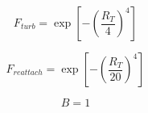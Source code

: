 \documentclass{article}
\begin{document}
\begin{equation}
F_{turb} = \exp\left[-\left(\frac{R_T}{4}\right)^4\right]
\end{equation}

\begin{equation}
F_{reattach} = \exp\left[-\left(\frac{R_T}{20}\right)^4\right]
\end{equation}

\begin{equation}
B=1
\end{equation}
\end{document}
